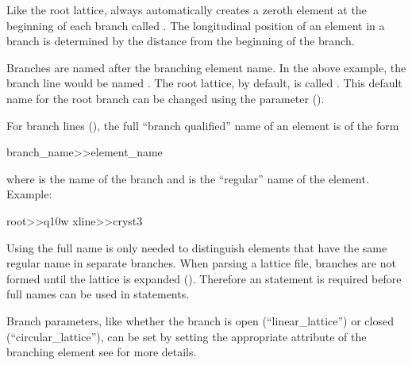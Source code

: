 Like the root lattice, \bmad always automatically creates a zeroth
element at the beginning of each branch called . The
longitudinal  position of an element in a branch is determined
by the distance from the beginning of the branch.

Branches are named after the branching element name. In the above
example, the branch line would be named . The root lattice,
by default, is called . This default name for the root branch
can be changed using the  parameter
().

For branch lines (), the full ``branch
qualified'' name of an element is of the form
\begin{example}
  branch_name>>element_name
\end{example}
where  is the name of the branch and  is the
``regular'' name of the element. Example:
\begin{example}
  root>>q10w
  xline>>cryst3
\end{example}
Using the full name is only needed to distinguish elements that have
the same regular name in separate branches.  When parsing a lattice
file, branches are not formed until the lattice is expanded
(). Therefore an  statement is
required before full names can be used in statements.

Branch parameters, like whether the branch is open
(``linear_lattice'') or closed (``circular_lattice''), can be set
by setting the appropriate attribute of the branching element
see  for more details.
